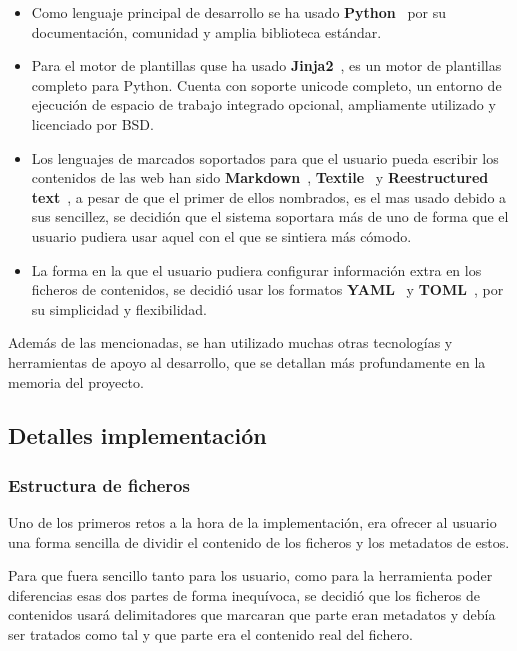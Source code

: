 \documentclass[a4paper,12pt]{article}
\begin{document}
\begin{itemize}
\item Como lenguaje principal de desarrollo se ha usado \textbf{Python}~\cite{python} por su
documentación, comunidad y amplia biblioteca estándar.

\item Para el motor de plantillas quse ha usado \textbf{Jinja2}~\cite{jinja}, es un motor de
plantillas completo para Python. Cuenta con soporte unicode completo, un entorno de ejecución de
espacio de trabajo integrado opcional, ampliamente utilizado y licenciado por BSD.

\item Los lenguajes de marcados soportados para que el usuario pueda escribir los contenidos de las web
han sido \textbf{Markdown}~\cite{markdown}, \textbf{Textile}~\cite{textile} y
\textbf{Reestructured text}~\cite{restructuredtext}, a pesar de que el primer de ellos nombrados, es el mas usado
debido a sus sencillez, se decidión que el sistema soportara más de uno de forma que el usuario pudiera usar aquel
con el que se sintiera más cómodo.

\item La forma en la que el usuario pudiera configurar información extra en los ficheros de contenidos, se decidió usar
    los formatos \textbf{YAML}~\cite{toml} y \textbf{TOML}~\cite{yaml}, por su simplicidad y flexibilidad.
\end{itemize}

Además de las mencionadas, se han utilizado muchas otras tecnologías y herramientas de apoyo
al desarrollo, que se detallan más profundamente en la memoria del proyecto.

\subsection{Detalles implementación}

\subsubsection{Estructura de ficheros}

Uno de los primeros retos a la hora de la implementación, era ofrecer al usuario una forma sencilla de dividir
el contenido de los ficheros y los metadatos de estos.

Para que fuera sencillo tanto para los usuario, como para la herramienta poder diferencias esas dos partes
de forma inequívoca, se decidió que los ficheros de contenidos usará delimitadores que marcaran que
parte eran metadatos y debía ser tratados como tal y que parte era el contenido real del fichero.
\end{document}
